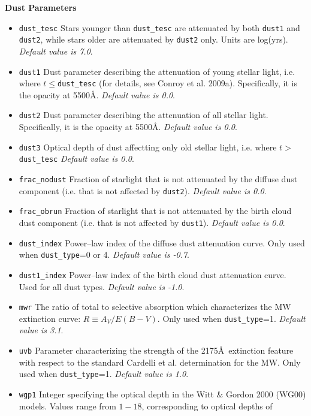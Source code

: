 \documentclass[]{article}
\begin{document}
\noindent
{\bf Dust Parameters}
\begin{itemize}
\item{\texttt{dust\_tesc}} Stars younger than \texttt{dust\_tesc} are attenuated
  by both \texttt{dust1} and \texttt{dust2}, while stars older are attenuated by
  \texttt{dust2} only.  Units are log(yrs).
  {\it Default value is 7.0}.
\item{\texttt{dust1}} Dust parameter describing the attenuation of young stellar
  light, i.e. where $t\leq$\texttt{dust\_tesc} (for details, see Conroy et al.
  2009a).  Specifically, it is the opacity at 5500\AA.
  {\it Default value is 0.0}.
\item{\texttt{dust2}} Dust parameter describing the attenuation of all stellar
  light.  Specifically, it is the opacity at 5500\AA.
  {\it Default value is 0.0}.
\item{\texttt{dust3}} Optical depth of dust affectting only old stellar light,
  i.e. where $t>$\texttt{dust\_tesc}
  {\it Default value is 0.0}.
\item{\texttt{frac\_nodust}} Fraction of starlight that is not attenuated by the
  diffuse dust component (i.e. that is not affected by \texttt{dust2}).
  {\it Default value is 0.0}.
\item{\texttt{frac\_obrun}} Fraction of starlight that is not attenuated by the
  birth cloud dust component (i.e. that is not affected by \texttt{dust1}).
  {\it Default value is 0.0}.
\item{\texttt{dust\_index}} Power--law index of the diffuse dust attenuation
  curve.  Only used when \texttt{dust\_type}=0 or 4.
  {\it Default value is -0.7}.
\item{\texttt{dust1\_index}} Power--law index of the birth cloud dust
  attenuation curve.  Used for all dust types.
  {\it Default value is -1.0}.
\item{\texttt{mwr}} The ratio of total to selective absorption which
  characterizes the MW extinction curve: $R\equiv A_V/E(B-V)$.  Only used when
  \texttt{dust\_type}=1.
  {\it Default value is 3.1}.
\item{\texttt{uvb}} Parameter characterizing the strength of the 2175\AA\,
  extinction feature with respect to the standard Cardelli et al.  determination
  for the MW.  Only used when \texttt{dust\_type}=1.
  {\it Default value is 1.0}.
\item{\texttt{wgp1}} Integer specifying the optical depth in the Witt \& Gordon
  2000 (WG00) models.  Values range from $1-18$, corresponding to optical depths
  of\\

\end{itemize}
\end{document}
